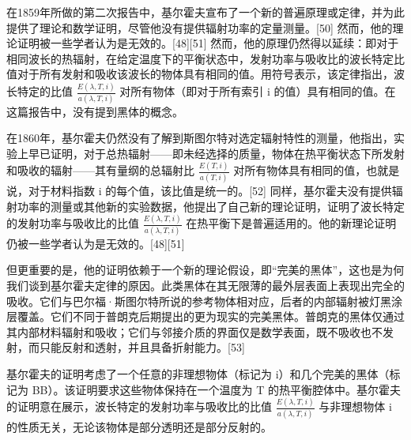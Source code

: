 在1859年所做的第二次报告中，基尔霍夫宣布了一个新的普遍原理或定律，并为此提供了理论和数学证明，尽管他没有提供辐射功率的定量测量。[50] 然而，他的理论证明被一些学者认为是无效的。[48][51] 然而，他的原理仍然得以延续：即对于相同波长的热辐射，在给定温度下的平衡状态中，发射功率与吸收比的波长特定比值对于所有发射和吸收该波长的物体具有相同的值。用符号表示，该定律指出，波长特定的比值 \( \frac{E(\lambda, T, i)}{a(\lambda, T, i)} \) 对所有物体（即对于所有索引 i 的值）具有相同的值。在这篇报告中，没有提到黑体的概念。

在1860年，基尔霍夫仍然没有了解到斯图尔特对选定辐射特性的测量，他指出，实验上早已证明，对于总热辐射——即未经选择的质量，物体在热平衡状态下所发射和吸收的辐射——其有量纲的总辐射比 \( \frac{E(T, i)}{a(T, i)} \) 对所有物体具有相同的值，也就是说，对于材料指数 i 的每个值，该比值是统一的。[52] 同样，基尔霍夫没有提供辐射功率的测量或其他新的实验数据，他提出了自己新的理论证明，证明了波长特定的发射功率与吸收比的比值 \( \frac{E(\lambda, T, i)}{a(\lambda, T, i)} \) 在热平衡下是普遍适用的。他的新理论证明仍被一些学者认为是无效的。[48][51]

但更重要的是，他的证明依赖于一个新的理论假设，即“完美的黑体”，这也是为何我们谈到基尔霍夫定律的原因。此类黑体在其无限薄的最外层表面上表现出完全的吸收。它们与巴尔福·斯图尔特所说的参考物体相对应，后者的内部辐射被灯黑涂层覆盖。它们不同于普朗克后期提出的更为现实的完美黑体。普朗克的黑体仅通过其内部材料辐射和吸收；它们与邻接介质的界面仅是数学表面，既不吸收也不发射，而只能反射和透射，并且具备折射能力。[53]

基尔霍夫的证明考虑了一个任意的非理想物体（标记为 i）和几个完美的黑体（标记为 BB）。该证明要求这些物体保持在一个温度为 T 的热平衡腔体中。基尔霍夫的证明意在展示，波长特定的发射功率与吸收比的比值 \( \frac{E(\lambda, T, i)}{a(\lambda, T, i)} \) 与非理想物体 i 的性质无关，无论该物体是部分透明还是部分反射的。